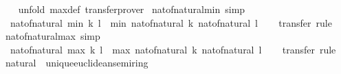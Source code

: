 \begin{isabellebody}
%
\isadelimproof
\ \ %
\endisadelimproof
%
\isatagproof
{}\isamarkupfalse%
\ {\isacharparenleft}{\kern0pt}unfold\ max{\isacharunderscore}{\kern0pt}def{\isacharparenright}{\kern0pt}\ transfer{\isacharunderscore}{\kern0pt}prover%
\endisatagproof
{\isafoldproof}%
%
\isadelimproof
\isanewline
%
\endisadelimproof
\isanewline
{}\isamarkupfalse%
\isanewline
\isanewline
{}\isamarkupfalse%
\ nat{\isacharunderscore}{\kern0pt}of{\isacharunderscore}{\kern0pt}natural{\isacharunderscore}{\kern0pt}min\ {\isacharbrackleft}{\kern0pt}simp{\isacharbrackright}{\kern0pt}{\isacharcolon}{\kern0pt}\isanewline
\ \ {\isachardoublequoteopen}nat{\isacharunderscore}{\kern0pt}of{\isacharunderscore}{\kern0pt}natural\ {\isacharparenleft}{\kern0pt}min\ k\ l{\isacharparenright}{\kern0pt}\ {\isacharequal}{\kern0pt}\ min\ {\isacharparenleft}{\kern0pt}nat{\isacharunderscore}{\kern0pt}of{\isacharunderscore}{\kern0pt}natural\ k{\isacharparenright}{\kern0pt}\ {\isacharparenleft}{\kern0pt}nat{\isacharunderscore}{\kern0pt}of{\isacharunderscore}{\kern0pt}natural\ l{\isacharparenright}{\kern0pt}{\isachardoublequoteclose}\isanewline
%
\isadelimproof
\ \ %
\endisadelimproof
%
\isatagproof
{}\isamarkupfalse%
\ transfer\ rule%
\endisatagproof
{\isafoldproof}%
%
\isadelimproof
\isanewline
%
\endisadelimproof
\isanewline
{}\isamarkupfalse%
\ nat{\isacharunderscore}{\kern0pt}of{\isacharunderscore}{\kern0pt}natural{\isacharunderscore}{\kern0pt}max\ {\isacharbrackleft}{\kern0pt}simp{\isacharbrackright}{\kern0pt}{\isacharcolon}{\kern0pt}\isanewline
\ \ {\isachardoublequoteopen}nat{\isacharunderscore}{\kern0pt}of{\isacharunderscore}{\kern0pt}natural\ {\isacharparenleft}{\kern0pt}max\ k\ l{\isacharparenright}{\kern0pt}\ {\isacharequal}{\kern0pt}\ max\ {\isacharparenleft}{\kern0pt}nat{\isacharunderscore}{\kern0pt}of{\isacharunderscore}{\kern0pt}natural\ k{\isacharparenright}{\kern0pt}\ {\isacharparenleft}{\kern0pt}nat{\isacharunderscore}{\kern0pt}of{\isacharunderscore}{\kern0pt}natural\ l{\isacharparenright}{\kern0pt}{\isachardoublequoteclose}\isanewline
%
\isadelimproof
\ \ %
\endisadelimproof
%
\isatagproof
{}\isamarkupfalse%
\ transfer\ rule%
\endisatagproof
{\isafoldproof}%
%
\isadelimproof
\isanewline
%
\endisadelimproof
\isanewline
{}\isamarkupfalse%
\ natural\ {\isacharcolon}{\kern0pt}{\isacharcolon}{\kern0pt}\ unique{\isacharunderscore}{\kern0pt}euclidean{\isacharunderscore}{\kern0pt}semiring\isanewline
{}\isanewline
\isanewline
{}\isamarkupfalse%

\end{isabellebody}
